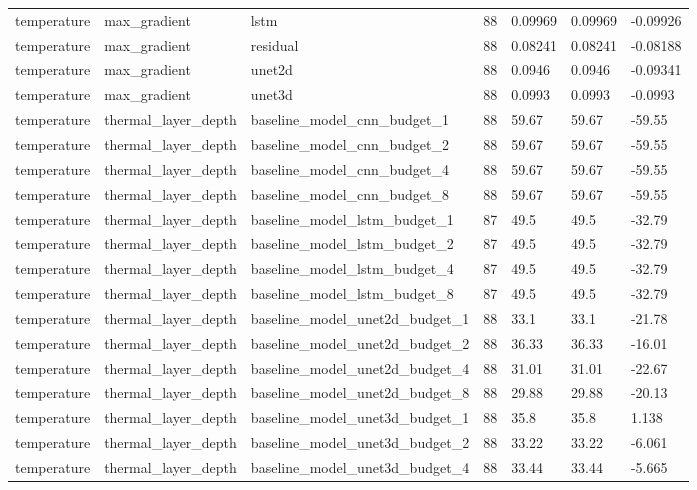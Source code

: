\begin{table}[htbp]
\begin{tabular}{lllllll}
temperature & max\_gradient & lstm & 88 & 0.09969 & 0.09969 & -0.09926 \\
temperature & max\_gradient & residual & 88 & 0.08241 & 0.08241 & -0.08188 \\
temperature & max\_gradient & unet2d & 88 & 0.0946 & 0.0946 & -0.09341 \\
temperature & max\_gradient & unet3d & 88 & 0.0993 & 0.0993 & -0.0993 \\
temperature & thermal\_layer\_depth & baseline\_model\_cnn\_budget\_1 & 88 & 59.67 & 59.67 & -59.55 \\
temperature & thermal\_layer\_depth & baseline\_model\_cnn\_budget\_2 & 88 & 59.67 & 59.67 & -59.55 \\
temperature & thermal\_layer\_depth & baseline\_model\_cnn\_budget\_4 & 88 & 59.67 & 59.67 & -59.55 \\
temperature & thermal\_layer\_depth & baseline\_model\_cnn\_budget\_8 & 88 & 59.67 & 59.67 & -59.55 \\
temperature & thermal\_layer\_depth & baseline\_model\_lstm\_budget\_1 & 87 & 49.5 & 49.5 & -32.79 \\
temperature & thermal\_layer\_depth & baseline\_model\_lstm\_budget\_2 & 87 & 49.5 & 49.5 & -32.79 \\
temperature & thermal\_layer\_depth & baseline\_model\_lstm\_budget\_4 & 87 & 49.5 & 49.5 & -32.79 \\
temperature & thermal\_layer\_depth & baseline\_model\_lstm\_budget\_8 & 87 & 49.5 & 49.5 & -32.79 \\
temperature & thermal\_layer\_depth & baseline\_model\_unet2d\_budget\_1 & 88 & 33.1 & 33.1 & -21.78 \\
temperature & thermal\_layer\_depth & baseline\_model\_unet2d\_budget\_2 & 88 & 36.33 & 36.33 & -16.01 \\
temperature & thermal\_layer\_depth & baseline\_model\_unet2d\_budget\_4 & 88 & 31.01 & 31.01 & -22.67 \\
temperature & thermal\_layer\_depth & baseline\_model\_unet2d\_budget\_8 & 88 & 29.88 & 29.88 & -20.13 \\
temperature & thermal\_layer\_depth & baseline\_model\_unet3d\_budget\_1 & 88 & 35.8 & 35.8 & 1.138 \\
temperature & thermal\_layer\_depth & baseline\_model\_unet3d\_budget\_2 & 88 & 33.22 & 33.22 & -6.061 \\
temperature & thermal\_layer\_depth & baseline\_model\_unet3d\_budget\_4 & 88 & 33.44 & 33.44 & -5.665 \\

\end{tabular}
\end{table}
